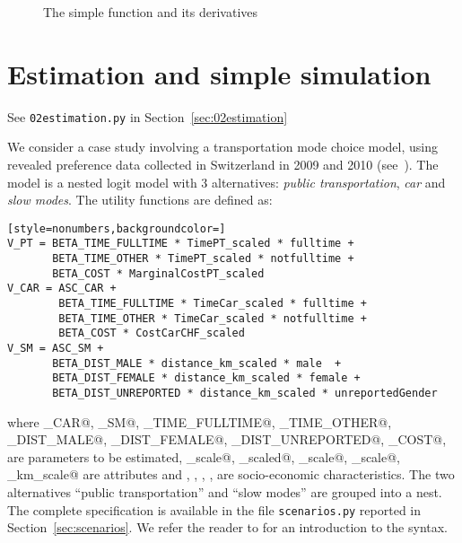 \documentclass[12pt,a4paper]{article}
\begin{document}
\begin{figure}
\begin{center}
  
\end{center}
\caption{\label{fig:fgh}The simple function and its derivatives}
\end{figure}

\section{Estimation and simple simulation}

\begin{flushright}
See \lstinline$02estimation.py$ in Section~\ref{sec:02estimation}
\end{flushright}

We consider a case study involving a transportation mode choice model,
using revealed preference data collected in Switzerland in 2009 and
2010 (see~\cite{AtaGlerBier2012_DISP}).
The model is a nested logit model with 3 alternatives: \emph{public
  transportation}, \emph{car} and \emph{slow modes}. The utility functions are defined as:
\begin{lstlisting}[style=nonumbers,backgroundcolor=]
V_PT = BETA_TIME_FULLTIME * TimePT_scaled * fulltime +
       BETA_TIME_OTHER * TimePT_scaled * notfulltime +
       BETA_COST * MarginalCostPT_scaled
V_CAR = ASC_CAR +
        BETA_TIME_FULLTIME * TimeCar_scaled * fulltime +
        BETA_TIME_OTHER * TimeCar_scaled * notfulltime +
        BETA_COST * CostCarCHF_scaled
V_SM = ASC_SM +
       BETA_DIST_MALE * distance_km_scaled * male  +
       BETA_DIST_FEMALE * distance_km_scaled * female +
       BETA_DIST_UNREPORTED * distance_km_scaled * unreportedGender
\end{lstlisting}
where
\lstinline@ASC_CAR@,
\lstinline@ASC_SM@,
\lstinline@BETA_TIME_FULLTIME@,
\lstinline@BETA_TIME_OTHER@,
\lstinline@BETA_DIST_MALE@,
\lstinline@BETA_DIST_FEMALE@,
\lstinline@BETA_DIST_UNREPORTED@,
\lstinline@BETA_COST@,
are parameters to be estimated,
\lstinline@TimePT_scale@,
\lstinline@MarginalCostPT_scaled@,
\lstinline@TimeCar_scale@,
\lstinline@CostCarCHF_scale@,
\lstinline@distance_km_scale@
are attributes and
\lstinline@fulltime@,
\lstinline@notfulltime@,
\lstinline@male@,
\lstinline@female@,
\lstinline@unreportedGender@ are socio-economic characteristics.
The two alternatives ``public transportation'' and ``slow modes'' are
grouped into a nest.
The complete specification is available in the file
\lstinline$scenarios.py$ reported in
Section~\ref{sec:scenarios}. We refer the reader to
 for an introduction to the syntax.
\end{document}
